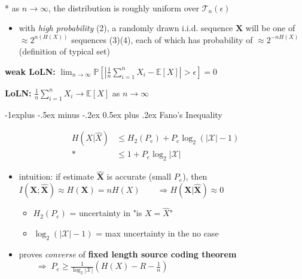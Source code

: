 \documentclass[10pt, landscape]{article}
\makeatletter
\renewcommand{\subsection}{\@startsection{subsection}{2}{0mm}%
  {-1explus -.5ex minus -.2ex}%
  {0.5ex plus .2ex}%
{\normalfont\normalsize\bfseries}}
\makeatother
\begin{document}
\begin{multicols*}{4}
  \begin{tightcenter}
    \\* as $n \to \infty$, the distribution is roughly uniform over $\mathcal{T}_n(\epsilon)$
  \end{tightcenter}

  \begin{itemize}
    \item with \textit{high probability} (2), a randomly drawn i.i.d. sequence $\mathbf{X}$ will be one of $\approx 2^{n(H(X))}$ sequences (3)(4),
      each of which has probability of $\approx 2^{-nH(X)}$ (definition of typical set)
  \end{itemize}

  \textbf{weak LoLN:} \( {\displaystyle{ \lim_{n \to \infty} \mathbb{P} \left[ \left\vert \frac{1}{n} \sum^n_{i=1} X_i - \mathbb{E}[X] \right\vert > \epsilon \right] = 0 }} \) 

  \textbf{LoLN:} $ \frac{1}{n}\sum^n_{i=1}X_i \to \mathbb{E}[X] $ as $n \to \infty$


  \subsection{Fano's Inequality}

  \begin{tightcenter}
    \setlength\abovedisplayskip{0pt}
    \setlength\belowdisplayskip{0pt}
    \setlength\abovedisplayshortskip{0pt}
    \setlength\belowdisplayshortskip{0pt}
    \begin{align*}
      H(X \vert \hat{X}) &\leq H_2(P_e) + P_e\log_2 (\vert\mathcal{X}\vert -1)  \\*
                         &\leq 1 + P_e \log_2 \vert \mathcal{X} \vert
    \end{align*}
  \end{tightcenter}

  \begin{itemize}
    \item intuition: if estimate $\hat{\mathbf{X}}$ is accurate (small $P_e$), then
      $I(\mathbf{X};\hat{\mathbf{X}}) \approx H(\mathbf{X}) = nH(X) \quad\quad \Rightarrow H(\mathbf{X}|\hat{\mathbf{X}}) \approx 0$
      \begin{itemize}
        \item $H_2(P_e)$ = uncertainty in "is $X=\hat{X}$"
        \item $\log_2(|\mathcal{X}|-1)$ = max uncertainty in the no case
      \end{itemize}
    \item proves \textit{converse} of \textbf{fixed length source coding theorem}
      $\quad\quad \Rightarrow \; P_e \geq \frac{1}{\log_2|\mathcal{X}|} (H(X) - R - \frac{1}{n})$
  \end{itemize}



\end{multicols*}
\end{document}
